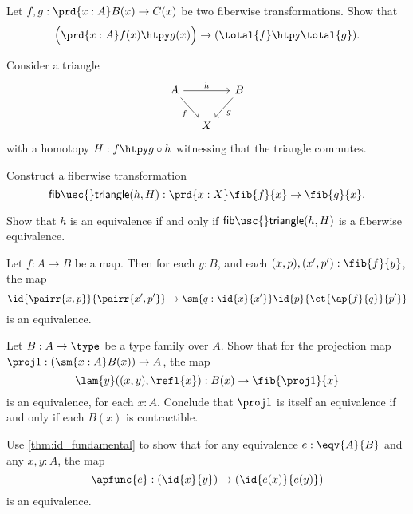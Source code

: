 \begin{exercises}
\item \label{ex:htpy_total} Let $f,g:\prd{x:A}B(x)\to C(x)$ be two fiberwise transformations. Show that
\begin{equation*}
\Big(\prd{x:A}f(x)\htpy g(x)\Big)\to (\total{f}\htpy \total{g}). 
\end{equation*}
\item \label{ex:fiber_trans}Consider a triangle
\begin{equation*}
\begin{tikzcd}[column sep=small]
A \arrow[rr,"h"] \arrow[dr,swap,"f"] & & B \arrow[dl,"g"] \\
& X
\end{tikzcd}
\end{equation*}
with a homotopy $H:f\htpy g\circ h$ witnessing that the triangle commutes. 
\begin{subexenum}
\item Construct a fiberwise transformation
\begin{equation*}
\mathsf{fib\usc{}triangle}(h,H):\prd{x:X}\fib{f}{x}\to\fib{g}{x}.
\end{equation*}
\item Show that $h$ is an equivalence if and only if $\mathsf{fib\usc{}triangle}(h,H)$ is a fiberwise equivalence.
\end{subexenum}
\item Let $f:A\to B$ be a map. Then for each $y:B$, and each $(x,p),(x',p'):\fib{f}{y}$, the map
\begin{equation*}
\id{\pairr{x,p}}{\pairr{x',p'}}\to \sm{q:\id{x}{x'}} \id{p}{\ct{\ap{f}{q}}{p'}}
\end{equation*}
is an equivalence. 
\item \label{ex:proj_fiber}Let $B:A\to \type$ be a type family over $A$. Show that for the projection map
$\proj 1 : (\sm{x:A}B(x))\to A$, the map
\begin{equation*}
\lam{y}((x,y),\refl{x}) : B(x)\to \fib{\proj 1}{x}
\end{equation*}
is an equivalence, for each $x:A$. Conclude that $\proj 1$ is itself an equivalence if and only if each $B(x)$ is contractible.
\item \label{ex:emb_equiv} Use \autoref{thm:id_fundamental} to show that for any equivalence $e:\eqv{A}{B}$ and any $x,y:A$, the map
\begin{equation*}
\apfunc{e}:(\id{x}{y})\to(\id{e(x)}{e(y)})
\end{equation*}
is an equivalence.

\end{exercises}
